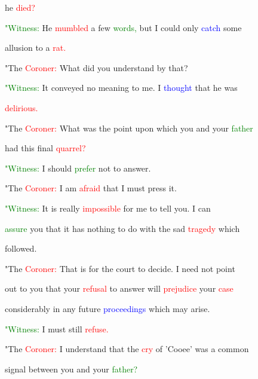  he \textcolor{red}{died?}



 \textcolor{green}{"Witness:} He \textcolor{red}{mumbled} a few \textcolor{green}{words,} but I could only \textcolor{blue}{catch} some

 allusion to a \textcolor{red}{rat.}



 "The \textcolor{red}{Coroner:} What did you understand by that?



 \textcolor{green}{"Witness:} It conveyed no meaning to me. I \textcolor{blue}{thought} that he was

 \textcolor{red}{delirious.}



 "The \textcolor{red}{Coroner:} What was the point upon which you and your \textcolor{green}{father}

 had this final \textcolor{red}{quarrel?}



 \textcolor{green}{"Witness:} I should \textcolor{green}{prefer} not to answer.



 "The \textcolor{red}{Coroner:} I am \textcolor{red}{afraid} that I must press it.



 \textcolor{green}{"Witness:} It is really \textcolor{red}{impossible} for me to tell you. I can

 \textcolor{green}{assure} you that it has nothing to do with the sad \textcolor{red}{tragedy} which

 followed.



 "The \textcolor{red}{Coroner:} That is for the \textcolor{BurntOrange}{court} to decide. I need not point

 out to you that your \textcolor{red}{refusal} to answer will \textcolor{red}{prejudice} your \textcolor{red}{case}

 considerably in any future \textcolor{blue}{proceedings} which may arise.



 \textcolor{green}{"Witness:} I must still \textcolor{red}{refuse.}



 "The \textcolor{red}{Coroner:} I understand that the \textcolor{red}{cry} of 'Cooee' was a common

 signal between you and your \textcolor{green}{father?}



